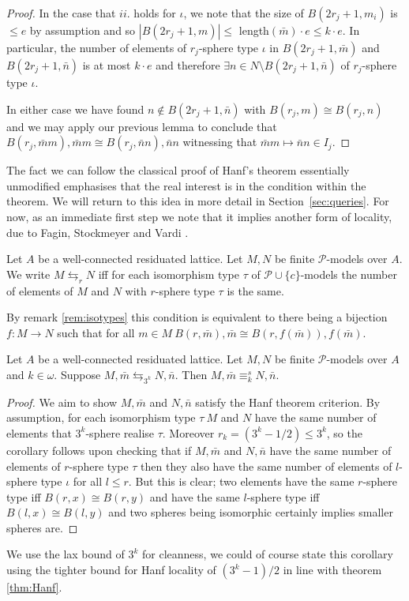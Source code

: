 \documentclass{lmcs} %
\newcommand{\?}{\ensuremath{\mkern0.4\thinmuskip}}
\let\isom=\cong%
\newcommand{\CP}{\mathcal{P}}
\begin{document}
\begin{proof}
    In the case that $ii.$ holds for $\iota$, we note that the size of $B(2r_j+1,m_i)$ is $\leq e$ by assumption and so $|B(2r_j+1,m)|\leq$ length$(\bar{m})\cdot e\leq k\cdot e$. In particular, the number of elements of $r_j$-sphere type $\iota$ in $B(2r_j+1,\bar{m})$ and $B(2r_j+1,\bar{n})$ is at most $k\cdot e$ and therefore $\exists n\in N\setminus B(2r_j+1,\bar{n})$ of $r_j$-sphere type $\iota$.  
    
    In either case we have found $n\not\in B(2r_j+1,\bar{n})$ with $B(r_j,m)\isom B(r_j,n)$ and we may apply our previous lemma to conclude that $B(r_j,\bar{m}m),\bar{m}m\isom B(r_j,\bar{n}n),\bar{n}n$ witnessing that $\bar{m}m\mapsto\bar{n}n\in I_j$.
\end{proof}

The fact we can follow the classical proof of Hanf's theorem essentially unmodified emphasises that the real interest is in the condition within the theorem. We will return to this idea in more detail in Section~\ref{sec:queries}. For now, as an immediate first step we note that it implies another form of locality, due to Fagin, Stockmeyer and Vardi \cite{FaginStockmeyerVardi94:monadicNPcoNP}.
\begin{defi}
    Let $A$ be a well-connected residuated lattice. Let $M,N$ be finite $\CP$-models over $A$. We write $M\leftrightarrows_{r} N$ iff for each isomorphism type $\tau$ of $\CP\cup\{c\}$-models the number of elements of $M$ and $N$ with $r$-sphere type $\tau$ is the same. 
\end{defi}
\begin{rem}
    By remark \ref{rem:isotypes} this condition is equivalent to there being a bijection $f\colon M\rightarrow N$ such that for all $m\in M\ B(r,\bar{m}),\bar{m}\isom B(r,f(\bar{m})),f(\bar{m})$.
\end{rem}
 
\begin{cor}\label{cor:Hanf}
    Let $A$ be a well-connected residuated lattice. Let $M,N$ be finite $\CP$-models over $A$ and $k\in\omega$. Suppose $M,\bar{m}\leftrightarrows_{3^k} N,\bar{n}$. Then $M,\bar{m}\equiv^s_k N,\bar{n}$. 
\end{cor}
\begin{proof}
    We aim to show $M,\bar{m}$ and $N,\bar{n}$ satisfy the Hanf theorem criterion. By assumption, for each isomorphism type $\tau\ M$ and $N$ have the same number of elements that $3^k$-sphere realise $\tau$. Moreover $r_k=(3^k-1/2)\leq 3^k$, so the corollary follows upon checking that if $M,\bar{m}$ and $N,\bar{n}$ have the same number of elements of $r$-sphere type $\tau$ then they also have the same number of elements of $l$-sphere type $\iota$ for all $l\leq r$. But this is clear; two elements have the same $r$-sphere type iff $B(r,x)\isom B(r,y)$ and have the same $l$-sphere type iff $B(l,x)\isom B(l,y)$ and two spheres being isomorphic certainly implies smaller spheres are.  
\end{proof}
\begin{rem}
    We use the lax bound of $3^k$ for cleanness, we could of course state this corollary using the tighter bound for Hanf locality of $(3^k-1)/2$ in line with theorem \ref{thm:Hanf}.
\end{rem}
\end{document}

